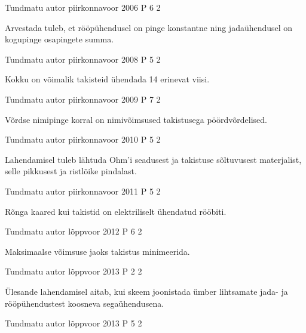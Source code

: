 \documentclass[11pt]{article}
\begin{document}
{%
{Tundmatu autor} %
{piirkonnavoor} %
{2006} %
{P 6} %
{2} %
{

\ifHint
Arvestada tuleb, et rööpühendusel on pinge konstantne ning jadaühendusel on kogupinge osapingete summa.
\fi
}

{Tundmatu autor} %
{piirkonnavoor} %
{2008} %
{P 5} %
{2} %
{

\ifHint
Kokku on võimalik takisteid ühendada 14 erinevat viisi.
\fi
}

{Tundmatu autor} %
{piirkonnavoor} %
{2009} %
{P 7} %
{2} %
{

\ifHint
Võrdse nimipinge korral on nimivõimsused takistusega pöördvõrdelised.
\fi
}

{Tundmatu autor} %
{piirkonnavoor} %
{2010} %
{P 5} %
{2} %
{

\ifHint
Lahendamisel tuleb lähtuda Ohm'i seadusest ja takistuse sõltuvusest materjalist, selle pikkusest ja ristlõike pindalast.
\fi
}

{Tundmatu autor} %
{piirkonnavoor} %
{2011} %
{P 5} %
{2} %
{

\ifHint
Rõnga kaared kui takistid on elektriliselt ühendatud rööbiti.
\fi
}


{Tundmatu autor} %
{lõppvoor} %
{2012} %
{P 6} %
{2} %
{

\ifHint
Maksimaalse võimsuse jaoks takistus minimeerida.
\fi
}

{Tundmatu autor} %
{lõppvoor} %
{2013} %
{P 2} %
{2} %
{

\ifHint
Ülesande lahendamisel aitab, kui skeem joonistada ümber lihtsamate jada- ja rööpühendustest koosneva segaühendusena.
\fi
}

{Tundmatu autor} %
{lõppvoor} %
{2013} %
{P 5} %
{2} %
{

}}
\end{document}
